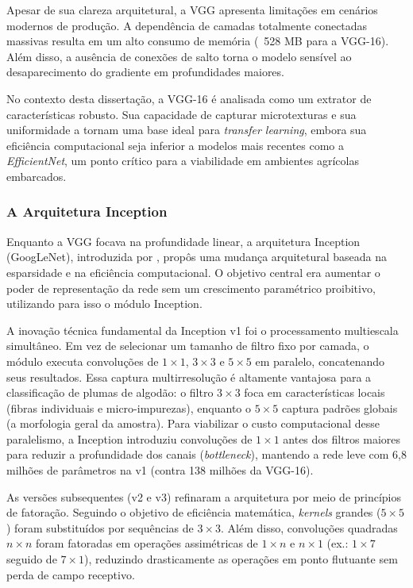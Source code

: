         
        Apesar de sua clareza arquitetural, a VGG apresenta limitações em cenários modernos de produção. A dependência de camadas totalmente conectadas massivas resulta em um alto consumo de memória (~528 MB para a VGG-16). Além disso, a ausência de conexões de salto torna o modelo sensível ao desaparecimento do gradiente em profundidades maiores.

        No contexto desta dissertação, a VGG-16 é analisada como um extrator de características robusto. Sua capacidade de capturar microtexturas e sua uniformidade a tornam uma base ideal para \textit{transfer learning}, embora sua eficiência computacional seja inferior a modelos mais recentes como a \textit{EfficientNet}, um ponto crítico para a viabilidade em ambientes agrícolas embarcados.

    \subsubsection{A Arquitetura Inception}

        Enquanto a VGG focava na profundidade linear, a arquitetura Inception (GoogLeNet), introduzida por , propôs uma mudança arquitetural baseada na esparsidade e na eficiência computacional. O objetivo central era aumentar o poder de representação da rede sem um crescimento paramétrico proibitivo, utilizando para isso o módulo Inception.

        A inovação técnica fundamental da Inception v1 foi o processamento multiescala simultâneo. Em vez de selecionar um tamanho de filtro fixo por camada, o módulo executa convoluções de $1 \times 1$, $3 \times 3$ e $5 \times 5$ em paralelo, concatenando seus resultados. Essa captura multirresolução é altamente vantajosa para a classificação de plumas de algodão: o filtro $3 \times 3$ foca em características locais (fibras individuais e micro-impurezas), enquanto o $5 \times 5$ captura padrões globais (a morfologia geral da amostra). Para viabilizar o custo computacional desse paralelismo, a Inception introduziu convoluções de $1 \times 1$ antes dos filtros maiores para reduzir a profundidade dos canais (\textit{bottleneck}), mantendo a rede leve com 6,8 milhões de parâmetros na v1 (contra 138 milhões da VGG-16).

        As versões subsequentes (v2 e v3) refinaram a arquitetura por meio de princípios de fatoração. Seguindo o objetivo de eficiência matemática, \textit{kernels} grandes ($5 \times 5$) foram substituídos por sequências de $3 \times 3$. Além disso, convoluções quadradas $n \times n$ foram fatoradas em operações assimétricas de $1 \times n$ e $n \times 1$ (ex.: $1 \times 7$ seguido de $7 \times 1$), reduzindo drasticamente as operações em ponto flutuante sem perda de campo receptivo. 

